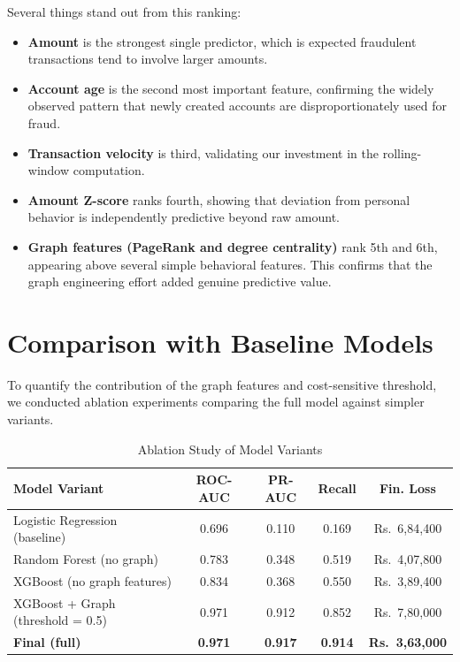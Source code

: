 Several things stand out from this ranking:

\begin{itemize}
    \item \textbf{Amount} is the strongest single predictor, which is expected fraudulent transactions tend to involve larger amounts.
    \item \textbf{Account age} is the second most important feature, confirming the widely observed pattern that newly created accounts are disproportionately used for fraud.
    \item \textbf{Transaction velocity} is third, validating our investment in the rolling-window computation.
    \item \textbf{Amount Z-score} ranks fourth, showing that deviation from personal behavior is independently predictive beyond raw amount.
    \item \textbf{Graph features (PageRank and degree centrality)} rank 5th and 6th, appearing above several simple behavioral features. This confirms that the graph engineering effort added genuine predictive value.
\end{itemize}

\section{Comparison with Baseline Models}

To quantify the contribution of the graph features and cost-sensitive threshold, we conducted ablation experiments comparing the full model against simpler variants.

\begin{table}[H]
\centering
\caption{Ablation Study of Model Variants}
\label{tab:ablation}
\begin{tabular}{|p{4.5cm}|c|c|c|c|}
\hline
\textbf{Model Variant} & \textbf{ROC-AUC} & \textbf{PR-AUC} & \textbf{Recall} & \textbf{Fin. Loss} \\
\hline
Logistic Regression (baseline) & 0.696 & 0.110 & 0.169 & Rs.\ 6,84,400 \\
\hline
Random Forest (no graph) & 0.783 & 0.348 & 0.519 & Rs.\ 4,07,800 \\
\hline
XGBoost (no graph features) & 0.834 & 0.368 & 0.550 & Rs.\ 3,89,400 \\
\hline
XGBoost + Graph (threshold = 0.5) & 0.971 & 0.912 & 0.852 & Rs.\ 7,80,000 \\
\hline
\textbf{Final (full)} & \textbf{0.971} & \textbf{0.917} & \textbf{0.914} & \textbf{Rs.\ 3,63,000} \\
\hline
\end{tabular}
\end{table}

